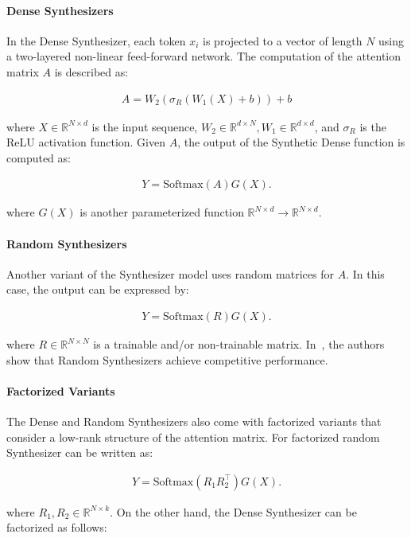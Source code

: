 \paragraph{Dense Synthesizers} In the Dense Synthesizer, each token $x_i$ is projected to a vector of length $N$ using a two-layered non-linear feed-forward network. The computation of the attention matrix $A$ is described as:

\begin{align}
A = W_2(\sigma_{R}(W_1(X)+b))+b    
\end{align}

where $X \in \mathbb{R}^{N \times d}$ is the input sequence, $W_2 \in \mathbb{R}^{d \times N}, W_1 \in \mathbb{R}^{d \times d}$, and $\sigma_R$ is the ReLU activation function. Given $A$, the output of the Synthetic Dense function is computed as:

\begin{align}
Y = \text{Softmax}(A)G(X).    
\end{align}

where $G(X)$ is another parameterized function $\mathbb{R}^{N \times d} \rightarrow \mathbb{R}^{N \times d}$. 
\paragraph{Random Synthesizers} Another variant of the Synthesizer model uses random matrices for $A$. In this case, the output can be expressed by:

\begin{align}
Y = \text{Softmax}(R)G(X).    
\end{align}

where $R \in \mathbb{R}^{N \times N}$ is a trainable and/or non-trainable matrix. In~\citet{tay2020synthesizer}, the authors show that Random Synthesizers achieve competitive performance.

\paragraph{Factorized Variants} The Dense and Random Synthesizers also come with factorized variants that consider a low-rank structure of the attention matrix. For factorized random Synthesizer can be written as:

\begin{align}
Y = \text{Softmax}(R_{1}R_{2}^{\top})G(X).    
\end{align}

where $R_{1},R_{2} \in \mathbb{R}^{N \times k}$. On the other hand, the Dense Synthesizer can be factorized as follows:

